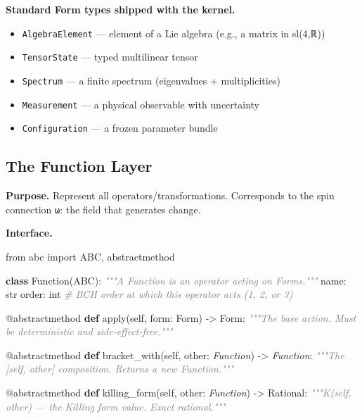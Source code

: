 \documentclass[11pt,a4paper]{article}
\newenvironment{Shaded}{\begin{snugshade}\small}{\end{snugshade}}
\newcommand{\ImportTok}[1]{#1}
\newcommand{\KeywordTok}[1]{\textbf{#1}}
\newcommand{\StringTok}[1]{\textit{#1}}
\newcommand{\CommentTok}[1]{\textit{\textcolor{gray}{#1}}}
\newcommand{\VariableTok}[1]{#1}
\newcommand{\OperatorTok}[1]{#1}
\newcommand{\BuiltInTok}[1]{#1}
\newcommand{\AttributeTok}[1]{#1}
\newcommand{\NormalTok}[1]{#1}
\providecommand{\tightlist}{\setlength{\itemsep}{0pt}\setlength{\parskip}{0pt}}
\begin{document}
\textbf{Standard Form types shipped with the kernel.}

\begin{itemize}
\tightlist
\item
  \texttt{AlgebraElement} --- element of a Lie algebra (e.g., a matrix
  in sl(4,ℝ))
\item
  \texttt{TensorState} --- typed multilinear tensor
\item
  \texttt{Spectrum} --- a finite spectrum (eigenvalues + multiplicities)
\item
  \texttt{Measurement} --- a physical observable with uncertainty
\item
  \texttt{Configuration} --- a frozen parameter bundle
\end{itemize}

\hypertarget{the-function-layer}{%
\subsection{The Function Layer}\label{the-function-layer}}

\textbf{Purpose.} Represent all operators/transformations. Corresponds
to the spin connection \texttt{ω}: the field that generates change.

\textbf{Interface.}

\begin{Shaded}
\begin{Highlighting}[]
\ImportTok{from}\NormalTok{ abc }\ImportTok{import}\NormalTok{ ABC, abstractmethod}

\KeywordTok{class}\NormalTok{ Function(ABC):}
    \CommentTok{"""A Function is an operator acting on Forms."""}
\NormalTok{    name: }\BuiltInTok{str}
\NormalTok{    order: }\BuiltInTok{int}  \CommentTok{\# BCH order at which this operator acts (1, 2, or 3)}

    \AttributeTok{@abstractmethod}
    \KeywordTok{def} \BuiltInTok{apply}\NormalTok{(}\VariableTok{self}\NormalTok{, form: Form) }\OperatorTok{{-}\textgreater{}}\NormalTok{ Form:}
        \CommentTok{"""The base action. Must be deterministic and side{-}effect{-}free."""}

    \AttributeTok{@abstractmethod}
    \KeywordTok{def}\NormalTok{ bracket\_with(}\VariableTok{self}\NormalTok{, other: }\StringTok{\textquotesingle{}Function\textquotesingle{}}\NormalTok{) }\OperatorTok{{-}\textgreater{}} \StringTok{\textquotesingle{}Function\textquotesingle{}}\NormalTok{:}
        \CommentTok{"""The [self, other] composition. Returns a new Function."""}

    \AttributeTok{@abstractmethod}
    \KeywordTok{def}\NormalTok{ killing\_form(}\VariableTok{self}\NormalTok{, other: }\StringTok{\textquotesingle{}Function\textquotesingle{}}\NormalTok{) }\OperatorTok{{-}\textgreater{}}\NormalTok{ Rational:}
        \CommentTok{"""K(self, other) --- the Killing form value. Exact rational."""}
\end{Highlighting}
\end{Shaded}
\end{document}
